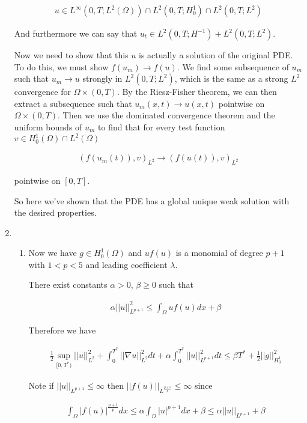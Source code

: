 \documentclass[12pt, letterpaper]{article}
\begin{document}
\begin{enumerate}
\begin{align}
u\in L^\infty(0,T;L^2(\Omega))\cap L^2(0,T;H^1_0)\cap L^2(0,T;L^2)
\end{align}

And furthermore we can say that $u_t\in L^2(0,T;H^{-1})+ L^2(0,T;L^2)$.

Now we need to show that this $u$ is actually a solution of the original PDE. To do this, we must show $f(u_m)\rightarrow f(u)$. We find some subsequence of $u_m$ such that $u_m\rightarrow u$ strongly in $L^2(0,T;L^2)$, which is the same as a strong $L^2$ convergence for $\Omega \times (0,T)$. By the Riesz-Fisher theorem, we can then extract a subsequence such that $u_m(x,t)\rightarrow u(x,t)$ pointwise on $\Omega \times (0,T)$. Then we use the dominated convergence theorem and the uniform bounds of $u_m$ to find that for every test function $v\in H_0^1(\Omega)\cap L^2(\Omega)$

\begin{align}
(f(u_m(t)),v)_{L^2}\rightarrow(f(u(t)),v)_{L^2}
\end{align}

pointwise on $[0,T]$.

So here we've shown that the PDE has a global unique weak solution with the desired properties.


\item \begin{enumerate}
\item Now we have $g\in H_0^1(\Omega)$ and $uf(u)$ is a monomial of degree $p+1$ with $1<p<5$ and leading coefficient $\lambda$.

There exist constants $\alpha>0$, $\beta\ge0$ such that

\begin{align}
\alpha||u||^2_{L^{p+1}}\le\int_\Omega uf(u)dx + \beta
\end{align}

Therefore we have

\begin{align}
\frac{1}{2}\sup_{[0,T^*)}||u||^2_{L^{2}} + \int_0^{T^*}||\nabla u||^2_{L^{2}}dt +\alpha\int_0^{T^*}||u||_{L^{p+1}}^2dt \le\beta T^*+\frac{1}{2}||g||^2_{H_0^1}
\end{align}

Note if $||u||_{L^{p+1}}\le\infty$ then $||f(u)||_{L^{\frac{p+1}{p}}}\le\infty$ since

\begin{align}
\int_\Omega |f(u)|^{\frac{p+1}{p}}dx\le \alpha\int_\Omega|u|^{p+1}dx+\beta\le\alpha||u||_{L^{p+1}}+\beta
\end{align}


\end{enumerate}
\end{enumerate}
\end{document}
